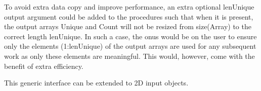 \begin{DoxyRefList}
\item[Type \mbox{\hyperlink{interfaceArrayUnique__mod_1_1getUnique}{Array\+Unique\+\_\+mod\+::get\+Unique}} ]\label{todo__todo000022}%
%
 To avoid extra data copy and improve performance, an extra optional {\ttfamily len\+Unique} output argument could be added to the procedures such that when it is present, the output arrays {\ttfamily Unique} and {\ttfamily Count} will not be resized from {\ttfamily size(\+Array)} to the correct length {\ttfamily len\+Unique}. In such a case, the onus would be on the user to ensure only the elements {\ttfamily (1\+:len\+Unique)} of the output arrays are used for any subsequent work as only these elements are meaningful. This would, however, come with the benefit of extra efficiency.

\label{todo__todo000021}%
%
 This generic interface can be extended to 2D input objects. ~\newline
 

\end{DoxyRefList}
